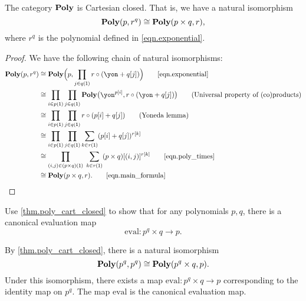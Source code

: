 \documentclass[Book-Poly]{subfiles}
\begin{document}

\begin{theorem}\label{thm.poly_cart_closed}
The category $\mathbf{Poly}$ is Cartesian closed. That is, we have a natural isomorphism
\[
    \mathbf{Poly}(p,r^q) \cong \mathbf{Poly}(p\times q,r),
\]
where $r^q$ is the polynomial defined in \eqref{eqn.exponential}.
\end{theorem}
\begin{proof}
We have the following chain of natural isomorphisms:
\begin{align*}
	\poly(p, r^q) &\iso
	\poly\Big(p, \prod_{j \in q(\1)} r \circ (\yon+q[j])\Big)
	\tag*{\eqref{eqn.exponential}} \\
	&\iso
	\prod_{i\in p(\1)}\prod_{j\in q(\1)}\poly\big(\yon^{p[i]},r\circ(\yon+q[j])\big)
	\tag{Universal property of (co)products} \\
	&\iso
	\prod_{i\in p(\1)}\prod_{j\in q(\1)}r\circ(p[i]+q[j])
	\tag{Yoneda lemma} \\
	&\iso
	\prod_{i\in p(\1)}\prod_{j\in q(\1)}\sum_{k\in r(\1)}(p[i]+q[j])^{r[k]}
	\\
	&\iso
	\prod_{(i,j) \in (p \times q)(\1)} \; \sum_{k\in r(\1)}(p \times q)[(i, j)]^{r[k]}
	\tag*{\eqref{eqn.poly_times}} \\
	&\iso
	\poly(p \times q,r).
	\tag*{\eqref{eqn.main_formula}}
\end{align*}
\end{proof}

\begin{exercise}
Use \cref{thm.poly_cart_closed} to show that for any polynomials $p,q$, there is a canonical evaluation map
\begin{equation*}%
	\text{eval}\colon p^q \times q \to p.
\end{equation*}
\begin{solution}
By \cref{thm.poly_cart_closed}, there is a natural isomorphism
\[
    \mathbf{Poly}(p^q, p^q) \cong \mathbf{Poly}(p^q \times q, p).
\]
Under this isomorphism, there exists a map $\text{eval} \colon p^q \times q \to p$ corresponding to the identity map on $p^q$.
The map $\text{eval}$ is the canonical evaluation map.
\end{solution}
\end{exercise}
\end{document}

